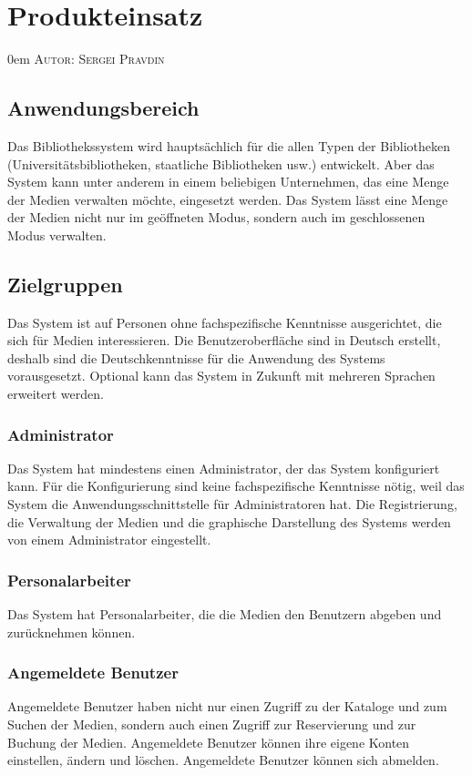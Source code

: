 \documentclass{article}
\makeatletter
\newcommand{\sectionauthor}[1]{
	{\parindent 0em \large \scshape Autor: #1 \par \nobreak \vspace*{2em}}
	\@afterheading
}
\makeatother
\begin{document}
\section{Produkteinsatz} %
\sectionauthor{Sergei Pravdin}
\subsection{Anwendungsbereich}
Das Bibliothekssystem wird hauptsächlich für die allen Typen der Bibliotheken (Universitätsbibliotheken, staatliche Bibliotheken usw.) entwickelt. Aber das System kann unter anderem in einem beliebigen Unternehmen, das eine Menge der Medien verwalten möchte, eingesetzt werden. Das System lässt eine Menge der Medien nicht nur im geöffneten Modus, sondern auch im geschlossenen Modus verwalten.
\subsection{Zielgruppen}
Das System ist auf Personen ohne fachspezifische Kenntnisse ausgerichtet, die sich für Medien interessieren. Die Benutzeroberfläche sind in Deutsch erstellt, deshalb sind die Deutschkenntnisse für die Anwendung des Systems vorausgesetzt. Optional kann das System in Zukunft mit mehreren Sprachen erweitert werden.
\subsubsection{Administrator}
Das System hat mindestens einen Administrator, der das System konfiguriert kann. Für die Konfigurierung sind keine fachspezifische Kenntnisse nötig, weil das System die Anwendungsschnittstelle für Administratoren hat. Die Registrierung, die Verwaltung der Medien und die graphische Darstellung des Systems werden von einem Administrator eingestellt.
\subsubsection{Personalarbeiter}
Das System hat Personalarbeiter, die die Medien den Benutzern abgeben und zurücknehmen können.
\subsubsection{Angemeldete Benutzer}
Angemeldete Benutzer haben nicht nur einen Zugriff zu der Kataloge und zum Suchen der Medien, sondern auch einen Zugriff zur Reservierung und zur Buchung der Medien. Angemeldete Benutzer können ihre eigene Konten einstellen, ändern und löschen. Angemeldete Benutzer können sich abmelden.
\end{document}

